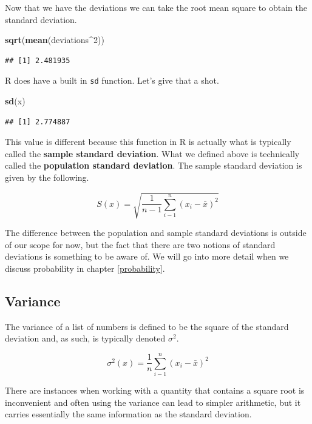 \documentclass[]{book}
\newenvironment{Shaded}{\begin{snugshade}}{\end{snugshade}}
\newcommand{\DecValTok}[1]{\textcolor[rgb]{0.00,0.00,0.81}{#1}}
\newcommand{\KeywordTok}[1]{\textcolor[rgb]{0.13,0.29,0.53}{\textbf{#1}}}
\newcommand{\NormalTok}[1]{#1}
\newcommand{\OperatorTok}[1]{\textcolor[rgb]{0.81,0.36,0.00}{\textbf{#1}}}
\begin{document}
Now that we have the deviations we can take the root mean square to obtain the standard deviation.

\begin{Shaded}
\begin{Highlighting}[]
\KeywordTok{sqrt}\NormalTok{(}\KeywordTok{mean}\NormalTok{(deviations}\OperatorTok{^}\DecValTok{2}\NormalTok{))}
\end{Highlighting}
\end{Shaded}

\begin{verbatim}
## [1] 2.481935
\end{verbatim}

R does have a built in \texttt{sd} function. Let's give that a shot.

\begin{Shaded}
\begin{Highlighting}[]
\KeywordTok{sd}\NormalTok{(x)}
\end{Highlighting}
\end{Shaded}

\begin{verbatim}
## [1] 2.774887
\end{verbatim}

This value is different because this function in R is actually what is typically called the \textbf{sample standard deviation}. What we defined above is technically called the \textbf{population standard deviation}. The sample standard deviation is given by the following.

\[S(x) = \sqrt{\frac{1}{n-1}\sum_{i-1}^n (x_i - \bar{x})^2}\]

The difference between the population and sample standard deviations is outside of our scope for now, but the fact that there are two notions of standard deviations is something to be aware of. We will go into more detail when we discuss probability in chapter \ref{probability}.

\hypertarget{variance}{%
\subsection{Variance}\label{variance}}

The variance of a list of numbers is defined to be the square of the standard deviation and, as such, is typically denoted \(\sigma^2\).

\[\sigma^2(x) = \frac{1}{n}\sum_{i-1}^n (x_i - \bar{x})^2\]

There are instances when working with a quantity that contains a square root is inconvenient and often using the variance can lead to simpler arithmetic, but it carries essentially the same information as the standard deviation.
\end{document}
